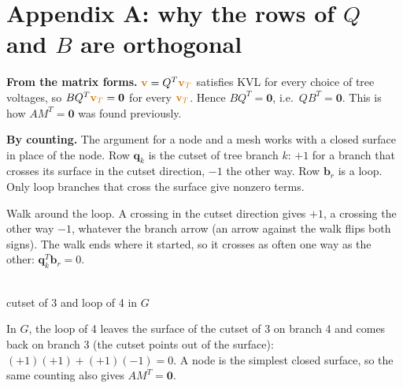 \documentclass[11pt,a4paper]{article}
\newcommand{\Vcol}[1]{\textcolor{cvolt}{#1}}
\newcommand{\sbranch}[5]{%
  \draw[#5] (#1) -- (#2);
  \node[blab] at ($(#1)!0.5!(#2)!0.28cm!#3:(#2)$) {#4};}
\newcommand{\tgcoords}{%
  \coordinate (g1) at (-1,1.73); \coordinate (g2) at (1,1.73);
  \coordinate (g3) at (-2,0);    \coordinate (g4) at (0,0);}
\newcommand{\tgnodes}{%
  \foreach \k/\pos in {1/above, 2/above, 3/below left, 4/below}
    {\fill[metured] (g\k) circle (2.2pt); \node[nlab, \pos=2pt] at (g\k) {\k};}}
\newcommand{\tgraph}[6]{%
  \sbranch{g2}{g1}{-90}{1}{#1}  \sbranch{g1}{g3}{-90}{2}{#2}  \sbranch{g1}{g4}{90}{3}{#3}
  \sbranch{g2}{g4}{90}{4}{#4}
  \draw[#5] (g2) to[out=-10, in=0, looseness=1.6] node[blab, pos=0.5, right=1pt] {5} (g4);
  \sbranch{g3}{g4}{-90}{6}{#6}
  \tgnodes}
\newcommand{\loopcw}[3][0.3]{%
  \draw[cvolt, thick, -{Stealth[length=2mm]}] ($(#2,#3)+(150:#1)$)
    arc[start angle=150, end angle=-150, radius=#1];}
\begin{document}
\clearpage
\section*{Appendix A: why the rows of $Q$ and $B$ are orthogonal}

\textbf{From the matrix forms.} $\Vcol{\mathbf{v}} = Q^T\Vcol{\mathbf{v}_T}$ satisfies KVL for
every choice of tree voltages, so $BQ^T\Vcol{\mathbf{v}_T} = \mathbf{0}$ for every
$\Vcol{\mathbf{v}_T}$. Hence $BQ^T = \mathbf{0}$, i.e.\ $QB^T = \mathbf{0}$. This is how
$AM^T = \mathbf{0}$ was found previously.

\noindent
\begin{minipage}[c]{0.56\linewidth}
\textbf{By counting.} The argument for a node and a mesh works with a closed surface in place
of the node. Row $\mathbf{q}_k$ is the cutset of tree branch $k$: $+1$ for a branch that
crosses its surface in the cutset direction, $-1$ the other way. Row $\mathbf{b}_r$ is a loop.
Only loop branches that cross the surface give nonzero terms.\par\smallskip
Walk around the loop. A crossing in the cutset direction gives $+1$, a crossing the other way
$-1$, whatever the branch arrow (an arrow against the walk flips both signs). The walk ends
where it started, so it crosses as often one way as the other: $\mathbf{q}_k^T\mathbf{b}_r = 0$.
\end{minipage}%
\hfill
\begin{minipage}[c]{0.41\linewidth}
\centering
{}\\[-1pt]
{\scriptsize\color{metugray} cutset of 3 and loop of 4 in $G$}
\end{minipage}

\smallskip
In $G$, the loop of 4 leaves the surface of the cutset of 3 on branch 4 and comes back on
branch 3 (the cutset points out of the surface): $(+1)(+1) + (+1)(-1) = 0$. A node is the simplest closed surface, so the same
counting also gives $AM^T = \mathbf{0}$.
\end{document}
